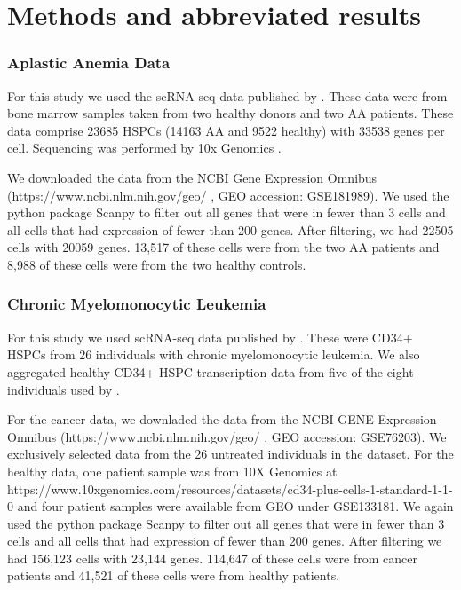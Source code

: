 \documentclass{article}
\begin{document}
\section{Methods and abbreviated results}

\subsubsection{Aplastic Anemia Data}
For this study we used the scRNA-seq data published by \citet{tonglin_single-cell_2022}.
These data were from bone marrow samples taken from two healthy donors and two AA patients.
These data comprise 23685 HSPCs (14163 AA and 9522 healthy) with 33538 genes per cell.
Sequencing was performed by 10x Genomics \citep{10X_genomics}.

We downloaded the data from the NCBI Gene Expression Omnibus (https://www.ncbi.nlm.nih.gov/geo/ , GEO accession: GSE181989).
We used the python package Scanpy \citep{wolf_scanpy_2018} to filter out all genes that were in fewer than 3 cells and all cells that had expression of fewer than 200 genes.
After filtering, we had 22505 cells with 20059 genes.
13,517 of these cells were from the two AA patients and 8,988 of these cells were from the two healthy controls.

\subsubsection{Chronic Myelomonocytic Leukemia}
For this study we used scRNA-seq data published by \citet{ferrall-fairbanks_progenitor_2022}.
These were CD34+ HSPCs from 26 individuals with chronic myelomonocytic leukemia.
We also aggregated healthy CD34+ HSPC transcription data from five of the eight individuals used by \citet{ferrall-fairbanks_progenitor_2022}.

For the cancer data, we downladed the data from the NCBI GENE Expression Omnibus (https://www.ncbi.nlm.nih.gov/geo/ , GEO accession: GSE76203).
We exclusively selected data from the 26 untreated individuals in the dataset.
For the healthy data, one patient sample was from 10X Genomics at https://www.10xgenomics.com/resources/datasets/cd34-plus-cells-1-standard-1-1-0 and four patient samples were available from GEO under GSE133181.
We again used the python package Scanpy to filter out all genes that were in fewer than 3 cells and all cells that had expression of fewer than 200 genes.
After filtering we had 156,123 cells with 23,144 genes.
114,647 of these cells were from cancer patients and 41,521 of these cells were from healthy patients.
\end{document}
